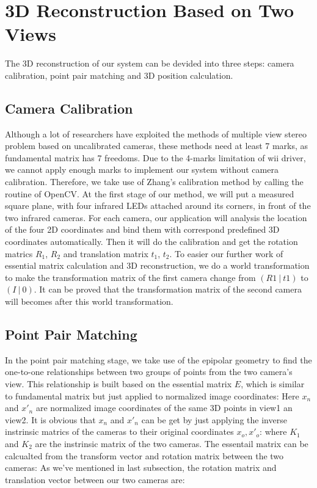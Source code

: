 \documentclass[10pt,twocolumn,letterpaper]{article}
\begin{document}
\section{3D Reconstruction Based on Two Views}
The 3D reconstruction of our system can be devided into three steps: camera calibration, point pair matching and 3D position calculation. 
\subsection{Camera Calibration}
Although a lot of researchers have exploited the methods of multiple view stereo problem based on uncalibrated cameras, these methods need at least 7 marks\cite{7points}, as fundamental matrix has 7 freedoms. Due to the 4-marks limitation of wii driver, we cannot apply enough marks to implement our system without camera calibration. Therefore, we take use of Zhang's calibration method by calling the routine of OpenCV. At the first stage of our method, we will put a measured square plane, with four infrared LEDs attached around its corners, in front of the two infrared cameras. For each camera, our application will analysis the location of the four 2D coordinates and bind them with correspond predefined 3D coordinates automatically. Then it will do the calibration and get the rotation matrics $R_{1}$, $R_{2}$ and translation matrix $t_{1}$, $t_{2}$. To easier our further work of essential matrix calculation and 3D reconstruction, we do a world transformation to make the transformation matrix of the first camera change from $( R1~ | ~t1 )$ to $( I~ | ~0 )$. It can be proved that the transformation matrix of the second camera will becomes 
\endequation after this world transformation. 

\subsection{Point Pair Matching}
In the point pair matching stage, we take use of the epipolar geometry to find the one-to-one relationships between two groups of points from the two camera's view. This relationship is built based on the essential matrix $E$, which is similar to fundamental matrix but just applied to normalized image coordinates: \endequation Here $x_{n}$ and $x'_{n}$ are normalized image coordinates of the same 3D points in view1 an view2. It is obvious that $x_{n}$ and $x'_{n}$ can be get by just applying the inverse instrinsic matrics of the cameras to their original coordinates $x_{o}, x'_{o}$: \endequation where $K_{1}$ and $K_{2}$ are the instrinsic matrix of the two cameras.
The essentail matrix can be calcualted from the transform vector and rotation matrix between the two cameras: \endequation
As we've mentioned in last subsection, the rotation matrix and translation vector between our two cameras are: \endequation {}\endequation 
\end{document}

